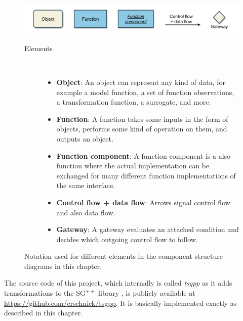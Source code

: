 \documentclass[
  a4paper,  %
  twoside,  %
  bibliography=totoc,
  headsepline,
  cleardoublepage=empty,
  parskip=half,
  draft=false
]{scrbook}
\begin{document}
\begin{mdframed}[style=style,frametitle={Notation}]
\begin{figure}[H]

\includegraphics[width=\textwidth]{graphics/definitions.pdf}
\vspace{-7.5mm}

\delimit

\vspace{3.5mm}

\begin{description}
\item[Elements] {~ \begin{itemize}[\null]
\item \textbf{Object}: An object can represent any kind of data, for example a model function, a set of function observations, a transformation function, a surrogate, and more.
\item \textbf{Function}: A function takes some inputs in the form of objects, performs some kind of operation on them, and outputs an object.
\item \textbf{Function component}: A function component is a also function where the actual implementation can be exchanged for many different function implementations of the same interface.
\item \textbf{Control flow + data flow}: Arrows signal control flow and also data flow.
\item \textbf{Gateway}: A gateway evaluates an attached condition and decides which outgoing control flow to follow.
\end{itemize}}
\end{description}

\delimit

\caption{Notation used for different elements in the component structure diagrams in this chapter.}
\label{fig:defs}
\end{figure}
\end{mdframed}
%
The source code of this project, which internally is called \textit{tsgpp} as it adds transformations to the $\mathrm{SG}^{++}$ library \cite{Pflueger2010}, is publicly available at \href{https://github.com/crschnick/tsgpp}{https://github.com/crschnick/tsgpp}.
It is basically implemented exactly as described in this chapter.
\end{document}
